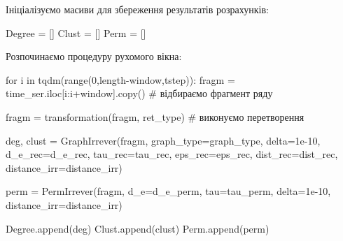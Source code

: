 \documentclass[
  letterpaper,
]{report}
\newenvironment{Shaded}{\begin{snugshade}}{\end{snugshade}}
\newcommand{\BuiltInTok}[1]{\textcolor[rgb]{0.00,0.23,0.31}{#1}}
\newcommand{\CommentTok}[1]{\textcolor[rgb]{0.37,0.37,0.37}{#1}}
\newcommand{\ControlFlowTok}[1]{\textcolor[rgb]{0.00,0.23,0.31}{#1}}
\newcommand{\DecValTok}[1]{\textcolor[rgb]{0.68,0.00,0.00}{#1}}
\newcommand{\FloatTok}[1]{\textcolor[rgb]{0.68,0.00,0.00}{#1}}
\newcommand{\KeywordTok}[1]{\textcolor[rgb]{0.00,0.23,0.31}{#1}}
\newcommand{\NormalTok}[1]{\textcolor[rgb]{0.00,0.23,0.31}{#1}}
\newcommand{\OperatorTok}[1]{\textcolor[rgb]{0.37,0.37,0.37}{#1}}
\begin{document}
Ініціалізуємо масиви для збереження результатів розрахунків:

\begin{Shaded}
\begin{Highlighting}[]
\NormalTok{Degree }\OperatorTok{=}\NormalTok{ []}
\NormalTok{Clust }\OperatorTok{=}\NormalTok{ []}
\NormalTok{Perm }\OperatorTok{=}\NormalTok{ []}
\end{Highlighting}
\end{Shaded}

Розпочинаємо процедуру рухомого вікна:

\begin{Shaded}
\begin{Highlighting}[]
\ControlFlowTok{for}\NormalTok{ i }\KeywordTok{in}\NormalTok{ tqdm(}\BuiltInTok{range}\NormalTok{(}\DecValTok{0}\NormalTok{,length}\OperatorTok{{-}}\NormalTok{window,tstep)):}
\NormalTok{    fragm }\OperatorTok{=}\NormalTok{ time\_ser.iloc[i:i}\OperatorTok{+}\NormalTok{window].copy() }\CommentTok{\# відбираємо фрагмент ряду}

\NormalTok{    fragm }\OperatorTok{=}\NormalTok{ transformation(fragm, ret\_type)  }\CommentTok{\# виконуємо перетворення}
        
\NormalTok{    deg, clust }\OperatorTok{=}\NormalTok{ GraphIrrever(fragm, }
\NormalTok{                            graph\_type}\OperatorTok{=}\NormalTok{graph\_type, }
\NormalTok{                            delta}\OperatorTok{=}\FloatTok{1e{-}10}\NormalTok{, }
\NormalTok{                            d\_e\_rec}\OperatorTok{=}\NormalTok{d\_e\_rec, }
\NormalTok{                            tau\_rec}\OperatorTok{=}\NormalTok{tau\_rec, }
\NormalTok{                            eps\_rec}\OperatorTok{=}\NormalTok{eps\_rec, }
\NormalTok{                            dist\_rec}\OperatorTok{=}\NormalTok{dist\_rec, }
\NormalTok{                            distance\_irr}\OperatorTok{=}\NormalTok{distance\_irr)  }
    
\NormalTok{    perm }\OperatorTok{=}\NormalTok{ PermIrrever(fragm, }
\NormalTok{                        d\_e}\OperatorTok{=}\NormalTok{d\_e\_perm, }
\NormalTok{                        tau}\OperatorTok{=}\NormalTok{tau\_perm, }
\NormalTok{                        delta}\OperatorTok{=}\FloatTok{1e{-}10}\NormalTok{, }
\NormalTok{                        distance\_irr}\OperatorTok{=}\NormalTok{distance\_irr)}
      
\NormalTok{    Degree.append(deg)}
\NormalTok{    Clust.append(clust)}
\NormalTok{    Perm.append(perm)}
\end{Highlighting}
\end{Shaded}
\end{document}
